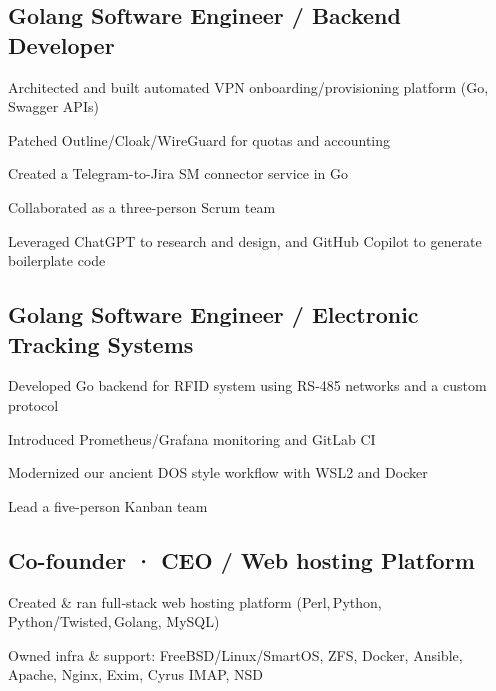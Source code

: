 \documentclass[letter,10pt]{article}
\begin{document}
\subsection{Golang Software Engineer / Backend Developer}
\begin{zitemize}
        \item Architected and built automated VPN onboarding/provisioning platform (Go, Swagger APIs)
        \item Patched Outline/Cloak/WireGuard for quotas and accounting
        \item Created a Telegram-to-Jira SM connector service in Go
        \item Collaborated as a three-person Scrum team
        \item Leveraged ChatGPT to research and design, and GitHub Copilot to generate boilerplate code
\end{zitemize}

\subsection{Golang Software Engineer / Electronic Tracking Systems}
\begin{zitemize}
        \item Developed Go backend for RFID system using RS‑485 networks and a custom protocol
        \item Introduced Prometheus/Grafana monitoring and GitLab CI
        \item Modernized our ancient DOS style workflow with WSL2 and Docker
        \item Lead a five-person Kanban team
\end{zitemize}

\subsection{Co-founder · CEO / Web hosting Platform}
\begin{zitemize}
        \item Created \& ran full‑stack web hosting platform (Perl, Python, Python/Twisted, Golang, MySQL)
        \item Owned infra \& support: FreeBSD/Linux/SmartOS, ZFS, Docker, Ansible, Apache, Nginx, Exim, Cyrus IMAP, NSD
\end{zitemize}
\end{document}
